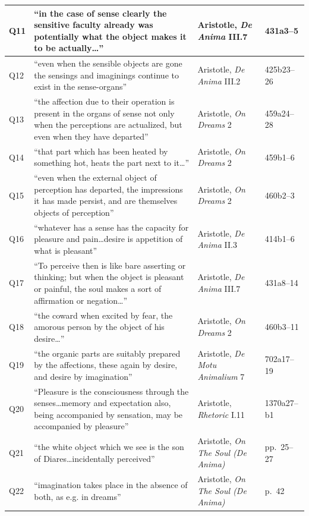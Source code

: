 \documentclass[12pt]{article}
\begin{document}
\begin{center}
\begin{tabular}{|l|l|l|l|}
Q11 & ``in the case of sense clearly the sensitive faculty already was potentially what the object makes it to be actually\dots'' & Aristotle, \textit{De Anima} III.7 & 431a3--5 \\
\hline
Q12 & ``even when the sensible objects are gone the sensings and imaginings continue to exist in the sense-organs'' & Aristotle, \textit{De Anima} III.2 & 425b23--26 \\
\hline
Q13 & ``the affection due to their operation is present in the organs of sense not only when the perceptions are actualized, but even when they have departed'' & Aristotle, \textit{On Dreams} 2 & 459a24--28 \\
\hline
Q14 & ``that part which has been heated by something hot, heats the part next to it\dots'' & Aristotle, \textit{On Dreams} 2 & 459b1--6 \\
\hline
Q15 & ``even when the external object of perception has departed, the impressions it has made persist, and are themselves objects of perception'' & Aristotle, \textit{On Dreams} 2 & 460b2--3 \\
\hline
Q16 & ``whatever has a sense has the capacity for pleasure and pain\dots desire is appetition of what is pleasant'' & Aristotle, \textit{De Anima} II.3 & 414b1--6 \\
\hline
Q17 & ``To perceive then is like bare asserting or thinking; but when the object is pleasant or painful, the soul makes a sort of affirmation or negation\dots'' & Aristotle, \textit{De Anima} III.7 & 431a8--14 \\
\hline
Q18 & ``the coward when excited by fear, the amorous person by the object of his desire\dots'' & Aristotle, \textit{On Dreams} 2 & 460b3--11 \\
\hline
Q19 & ``the organic parts are suitably prepared by the affections, these again by desire, and desire by imagination'' & Aristotle, \textit{De Motu Animalium} 7 & 702a17--19 \\
\hline
Q20 & ``Pleasure is the consciousness through the senses\dots memory and expectation also, being accompanied by sensation, may be accompanied by pleasure'' & Aristotle, \textit{Rhetoric} I.11 & 1370a27--b1 \\
\hline
Q21 & ``the white object which we see is the son of Diares\dots incidentally perceived'' & Aristotle, \textit{On The Soul (De Anima)} & pp.~25--27 \\
\hline
Q22 & ``imagination takes place in the absence of both, as e.g. in dreams'' & Aristotle, \textit{On The Soul (De Anima)} & p.~42 \\

\end{tabular}
\end{center}
\end{document}
